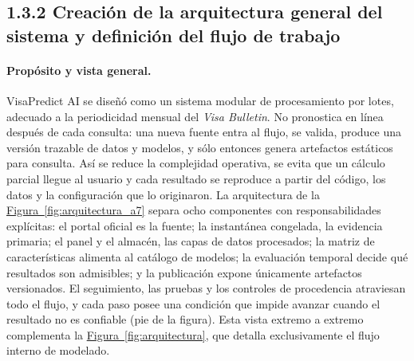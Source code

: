 \documentclass[12pt,letterpaper]{report}
\begin{document}
\subsection{1.3.2 Creación de la arquitectura general del sistema y definición del flujo de trabajo}

\paragraph{Propósito y vista general.} VisaPredict AI se diseñó como un sistema modular de
procesamiento por lotes, adecuado a la periodicidad mensual del \textit{Visa Bulletin}. No
pronostica en línea después de cada consulta: una nueva fuente entra al flujo, se valida,
produce una versión trazable de datos y modelos, y sólo entonces genera artefactos estáticos
para consulta. Así se reduce la complejidad operativa, se evita que un cálculo parcial llegue
al usuario y cada resultado se reproduce a partir del código, los datos y la configuración que
lo originaron. La arquitectura de la \hyperref[fig:arquitectura_a7]{Figura~\ref*{fig:arquitectura_a7}} separa ocho componentes
con responsabilidades explícitas: el portal oficial es la fuente; la instantánea congelada, la
evidencia primaria; el panel y el almacén, las capas de datos procesados; la matriz de
características alimenta al catálogo de modelos; la evaluación temporal decide qué resultados
son admisibles; y la publicación expone únicamente artefactos versionados. El seguimiento, las
pruebas y los controles de procedencia atraviesan todo el flujo, y cada paso posee una condición
que impide avanzar cuando el resultado no es confiable (pie de la figura). Esta vista extremo a extremo complementa la \hyperref[fig:arquitectura]{Figura~\ref*{fig:arquitectura}}, que detalla exclusivamente el flujo interno de modelado.
\end{document}
